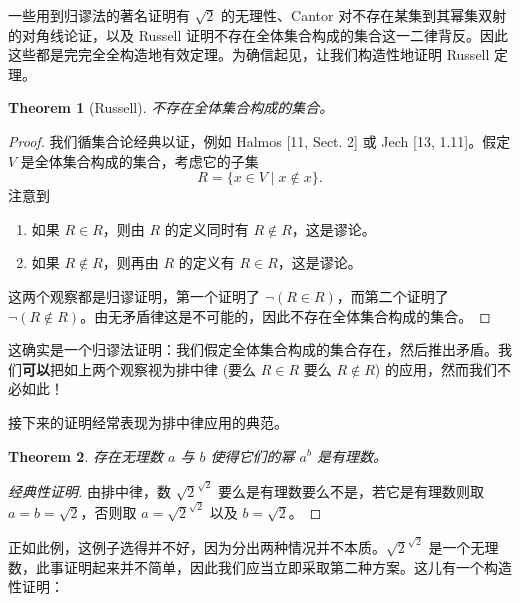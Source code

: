 \documentclass{ctexart}
\newtheorem{theorem}{Theorem}
\begin{document}
        一些用到归谬法的著名证明有 \( \sqrt{2} \) 的无理性、Cantor 对不存在某集到其幂集双射的对角线论证，以及 Russell 证明不存在全体集合构成的集合这一二律背反。因此这些都是完完全全构造地有效定理。为确信起见，让我们构造性地证明 Russell 定理。

        

        \begin{theorem}[Russell]

          不存在全体集合构成的集合。
          
        \end{theorem}

        \begin{proof}
            我们循集合论经典以证，例如 Halmos [11, Sect. 2] 或 Jech [13, 1.11]。假定 \( V \) 是全体集合构成的集合，考虑它的子集
            \[
            R = \{x \in V \mid x \notin x\}.
            \]
            注意到
            \begin{enumerate}
                \item 如果 \( R \in R \)，则由 \( R \) 的定义同时有 \( R \notin R \)，这是谬论。
                \item 如果 \( R \notin R \)，则再由 \( R \) 的定义有 \( R \in R \)，这是谬论。 
            \end{enumerate}
            这两个观察都是归谬证明，第一个证明了 \( \neg (R \in R)\)，而第二个证明了 \( \neg (R \notin R)\)。由无矛盾律这是不可能的，因此不存在全体集合构成的集合。
        \end{proof}

        这确实是一个归谬法证明：我们假定全体集合构成的集合存在，然后推出矛盾。我们\textbf{可以}把如上两个观察视为排中律 (要么 \( R \in R \) 要么 \( R \notin R \)) 的应用，然而我们不必如此！

        接下来的证明经常表现为排中律应用的典范。
        
        \begin{theorem}
            存在无理数 \( a \) 与 \( b \) 使得它们的幂 \( a^b \) 是有理数。
        \end{theorem}
            
        \begin{proof}[经典性证明]
            由排中律，数 \( \sqrt{2} ^ {\sqrt{2}} \) 要么是有理数要么不是，若它是有理数则取 \( a = b = \sqrt{2} \)，否则取 \( a = \sqrt{2} ^ {\sqrt{2}}\) 以及 \( b = \sqrt{2} \)。
        \end{proof}

        正如此例，这例子选得并不好，因为分出两种情况并不本质。\( \sqrt{2} ^ {\sqrt{2}} \) 是一个无理数，此事证明起来并不简单，因此我们应当立即采取第二种方案。这儿有一个构造性证明：
\end{document}
